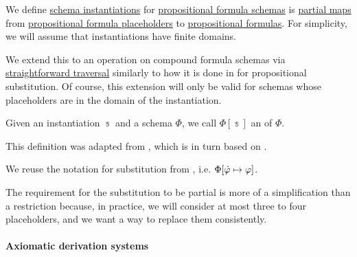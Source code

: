 \begin{definition}\label{def:propositional_schema_instantiation}\mimprovised
  We define \hyperref[con:schemas_and_instances]{schema instantiations} for \hyperref[def:propositional_formula_schema]{propositional formula schemas} is \hyperref[def:set_valued_map/partial]{partial maps} from \hyperref[def:propositional_formula_schema]{propositional formula placeholders} to \hyperref[def:propositional_syntax/formula]{propositional formulas}. For simplicity, we will assume that instantiations have finite domains.

  We extend this to an operation on compound formula schemas via \hyperref[rem:straightforward_traversal]{straightforward traversal} similarly to how it is done in  for propositional substitution. Of course, this extension will only be valid for schemas whose placeholders are in the domain of the instantiation.

  Given an instantiation \( \Bbbs \) and a schema \( \Phi \), we call \( \Phi[\Bbbs] \) an  of \( \Phi \).
\end{definition}
\begin{comments}
  \item This definition was adapted from , which is in turn based on \cite[def. 3.1.3]{CitkinMuravitsky2022ConsequenceRelations}.

  \item We reuse the notation for substitution from , i.e. \( \Phi[\dot{\varphi} \mapsto \varphi] \).

  \item The requirement for the substitution to be partial is more of a simplification than a restriction because, in practice, we will consider at most three to four placeholders, and we want a way to replace them consistently.
\end{comments}

\paragraph{Axiomatic derivation systems}

